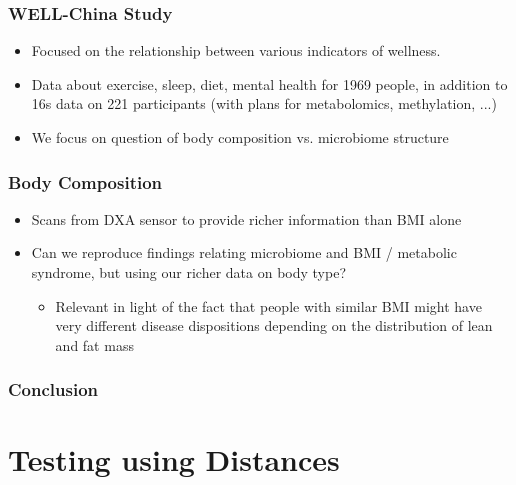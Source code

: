 \documentclass{beamer}
\begin{document}
\begin{frame}
  \frametitle{WELL-China Study}
  \begin{itemize}
  \item Focused on the relationship between various indicators of wellness.
  \item Data about exercise, sleep, diet, mental health for 1969 people, in
    addition to 16s data on 221 participants (with plans for metabolomics,
    methylation, ...)
  \item We focus on question of body composition vs. microbiome structure
  \end{itemize}
\end{frame}

\begin{frame}
  \frametitle{Body Composition}
  \begin{itemize}
  \item Scans from DXA sensor to provide richer information than BMI alone
  \item Can we reproduce findings relating microbiome and BMI / metabolic
    syndrome, but using our richer data on body type?
    \begin{itemize}
    \item Relevant in light of the fact that people with similar BMI might have
      very different disease dispositions depending on the distribution of lean
      and fat mass
    \end{itemize}
  \end{itemize}  
\end{frame}

\begin{frame}
  \frametitle{Conclusion}
  
\end{frame}

\section{Testing using Distances}
\label{sec:testing_distances}
\end{document}
